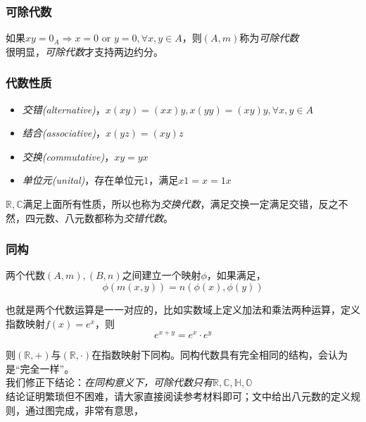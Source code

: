 \documentclass[hpyerref,UTF8,a4paper,titlepage,12pt,oneside]{ctexbook}
\theoremstyle{definition}
\begin{document}
	\subsubsection*{可除代数}
		如果$xy = 0_A \Rightarrow x=0 \text{ or } y=0, \forall x,y \in A$，则$(A,m)$称为\textit{可除代数}\\

		很明显，\textit{可除代数}才支持两边约分。

	\subsubsection*{代数性质}
 		\begin{itemize}
	 		\item \textit{交错(alternative)}，$x(xy) = (xx)y, x(yy) = (xy)y, \forall x,y \in A$
	 		\item \textit{结合(associative)}，$x(yz) = (xy)z$
	 		\item \textit{交换(commutative)}，$xy = yx$
	 		\item \textit{单位元(unital)}，存在单位元$1$，满足$x1 = x = 1x$
 		\end{itemize}

 		$\mathbb{R},\mathbb{C}$满足上面所有性质，所以也称为\textit{交换代数}，满足交换一定满足交错，反之不然，四元数、八元数都称为\textit{交错代数}。

 	\subsubsection*{同构}
 		两个代数$(A,m),(B,n)$之间建立一个映射$\phi$，如果满足，
 		$$
 			\phi(m(x,y))  = n(\phi(x),\phi(y))
 		$$

 		也就是两个代数运算是一一对应的，比如实数域上定义加法和乘法两种运算，定义指数映射$f(x) = e^x$，则
 		$$
 			e^{x+y} = e^x \cdot e^y
 		$$

 		则$(\mathbb{R},+)$与$(\mathbb{R},\cdot)$在指数映射下同构。同构代数具有完全相同的结构，会认为是“完全一样”。\\


 	我们修正下结论：\textit{在同构意义下，可除代数只有$\mathbb{R},\mathbb{C},\mathbb{H},\mathbb{O}$}\\

 	结论证明繁琐但不困难，请大家直接阅读参考材料即可；文中给出八元数的定义规则，通过图完成，非常有意思，
\end{document}
